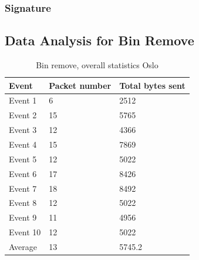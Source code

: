 \subsubsection{Signature}


\subsection{Data Analysis for Bin Remove}

\begin{table}[H]
\centering
\caption{Bin remove, overall statistics Oslo}
\label{tab:BRoverallOslo}
\begin{tabular}{|l|l|l|}
\hline
\textbf{Event} & \textbf{Packet number} & \textbf{Total bytes sent} \\ \hline
Event 1        & 6                      & 2512                      \\ \hline
Event 2        & 15                     & 5765                      \\ \hline
Event 3        & 12                     & 4366                      \\ \hline
Event 4        & 15                     & 7869                      \\ \hline
Event 5        & 12                     & 5022                      \\ \hline
Event 6        & 17                     & 8426                      \\ \hline
Event 7        & 18                     & 8492                      \\ \hline
Event 8        & 12                     & 5022                      \\ \hline
Event 9        & 11                     & 4956                      \\ \hline
Event 10       & 12                     & 5022                      \\ \hline
Average        & 13                     & 5745.2                    \\ \hline
\end{tabular}
\end{table}


